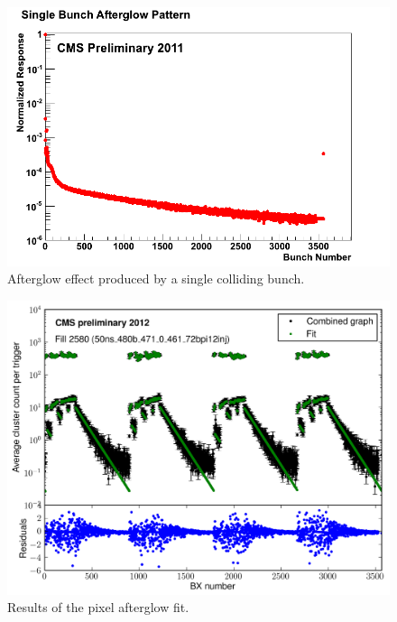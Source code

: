  
\begin{figure}[H]
  \centering
  \includegraphics[width=0.5\columnwidth]{./SingleBunchAfterglow.png}
  \caption{Afterglow effect produced by a single colliding bunch.}
  \label{fig:LHC}
\end{figure}

\begin{figure}[H]
  \centering
  \includegraphics[width=0.5\columnwidth]{./afterglow.png}
  \caption{Results of the pixel afterglow fit.}
  \label{fig:LHC}
\end{figure}




